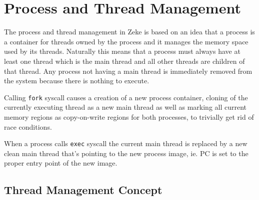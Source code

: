 \part{Process and Thread Management}

The process and thread management in Zeke is based on an idea
that a process is a container for threads owned by the process
and it manages the memory space used by its threads. Naturally
this means that a process must always have at least one thread
which is the main thread and all other threads are children of
that thread. Any process not having a main thread is immediately
removed from the system because there is nothing to execute.

Calling \verb+fork+ syscall causes a creation of a new process
container, cloning of the currently executing thread as a new
main thread as well as marking all current memory regions as
copy-on-write regions for both processes, to trivially get rid
of race conditions.

When a process calls \verb+exec+ syscall the current main thread
is replaced by a new clean main thread that's pointing to the
new process image, ie. \acs{PC} is set to the proper entry point of
the new image.

\chapter{Thread Management Concept}

